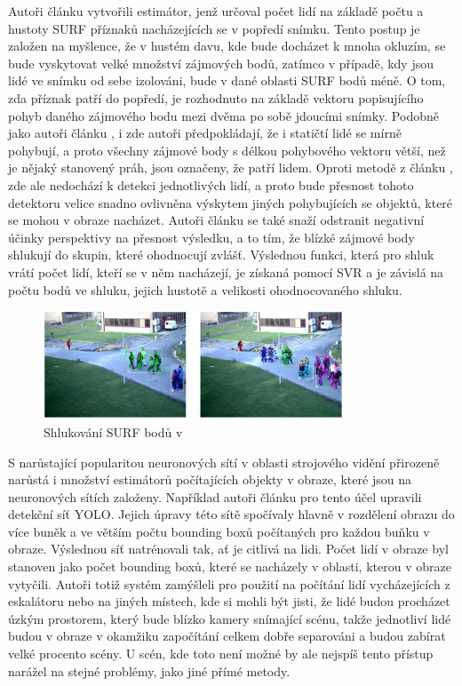 Autoři článku \cite{crowd_on_pets} vytvořili estimátor, jenž určoval počet lidí na základě počtu a hustoty SURF příznaků nacházejících se v popředí snímku.
Tento postup je založen na myšlence, že v hustém davu, kde bude docházet k mnoha okluzím, se bude vyskytovat velké množství zájmových bodů, zatímco v případě, kdy jsou lidé ve snímku od sebe izolováni, bude v dané oblasti SURF bodů méně.
O tom, zda příznak patří do popředí, je rozhodnuto na základě vektoru popisujícího pohyb daného zájmového bodu mezi dvěma po sobě jdoucími snímky.
Podobně jako autoři článku \cite{head_and_shoulders}, i zde autoři předpokládají, že i statičtí lidé se mírně pohybují, a proto všechny zájmové body s délkou pohybového vektoru větší, než je nějaký stanovený práh, jsou označeny, že patří lidem.
Oproti metodě z článku \cite{head_and_shoulders}, zde ale nedochází k detekci jednotlivých lidí, a proto bude přesnost tohoto detektoru velice snadno ovlivněna výskytem jiných pohybujících se objektů, které se mohou v obraze nacházet.
Autoři článku se také snaží odstranit negativní účinky perspektivy na přesnost výsledku, a to tím, že blízké zájmové body shlukují do skupin, které ohodnocují zvlášť.
Výslednou funkci, která pro shluk vrátí počet lidí, kteří se v něm nacházejí, je získaná pomocí SVR a je závislá na počtu bodů ve shluku, jejich hustotě a velikosti ohodnocovaného shluku.

\begin{figure}[h!]
	\centering
	\includegraphics[width=0.8\textwidth]{Figures/history/PETS_CLUSTERS.png}
	\caption{Shlukování SURF bodů v \cite{crowd_on_pets}}
	\label{fig:PETS}
\end{figure}


S narůstající popularitou neuronových sítí v oblasti strojového vidění přirozeně narůstá i množství estimátorů počítajících objekty v obraze, které jsou na neuronových sítích založeny.
Například autoři článku \cite{YOLO_counting} pro tento účel upravili detekční síť YOLO.
Jejich úpravy této sítě spočívaly hlavně v rozdělení obrazu do více buněk a ve větším počtu bounding boxů počítaných pro každou buňku v obraze. Výslednou síť natrénovali tak, ať je citlivá na lidi.
Počet lidí v obraze byl stanoven jako počet bounding boxů, které se nacházely v oblasti, kterou v obraze vytyčili.
Autoři totiž systém zamýšleli pro použití na počítání lidí vycházejících z eskalátoru nebo na jiných místech, kde si mohli být jisti, že lidé budou procházet úzkým prostorem, který bude blízko kamery snímající scénu, takže jednotliví lidé budou v obraze v okamžiku započítání celkem dobře separováni a budou zabírat velké procento scény.
U scén, kde toto není možné by ale nejspíš tento přístup narážel na stejné problémy, jako jiné přímé metody.


